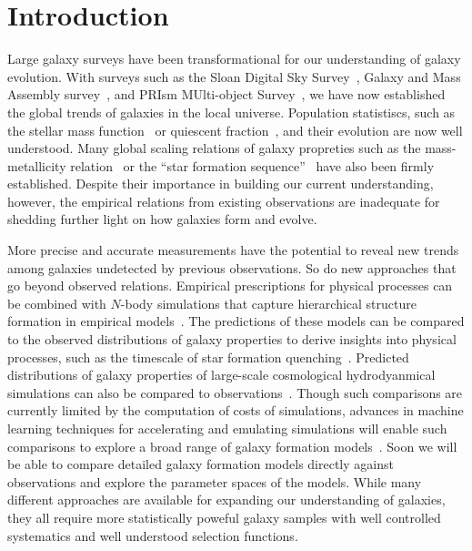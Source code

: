 \section{Introduction} \label{sec:intro} 
Large galaxy surveys have been transformational for our understanding of galaxy
evolution. 
With surveys such as the Sloan Digital Sky Survey~\citep[SDSS;][]{york2000},
Galaxy and Mass Assembly survey~\citep[GAMA;][]{driver2011}, and 
PRIsm MUlti-object Survey~\citep[PRIMUS;][]{coil2011}, 
we have now established the global trends of galaxies in the local universe. 
Population statistiscs, such as the stellar mass 
function~\citep{li2009, marchesini2009, moustakas2013} or quiescent
fraction~\citep{kauffmann2003a, blanton2003, baldry2006, taylor2009}, and their
evolution are now well understood. 
Many global scaling relations of galaxy propreties such as the mass-metallicity
relation~\citep{tremonti2004} or
the ``star formation sequence''~\citep{noeske2007, daddi2007, salim2007} have
also been firmly established. 
Despite their importance in building our current understanding, however,
the empirical relations from existing observations are inadequate for
shedding further light on how galaxies form and evolve.

More precise and accurate measurements have the potential to reveal new trends
among galaxies undetected by previous observations.
So do new approaches that go beyond observed relations.
Empirical prescriptions for physical processes can be combined with $N$-body
simulations that capture hierarchical structure formation in empirical 
models~\citep[\emph{e.g.} {\sc UniverseMachine}][]{behroozi2019}. 
The predictions of these models can be compared to the observed distributions
of galaxy properties to derive insights into physical processes, such as the
timescale of star formation quenching~\citep{wetzel2013, hahn2017, tinker2017}. 
Predicted distributions of galaxy properties of large-scale cosmological 
hydrodyanmical simulations can also be compared to 
observations~\citep[\emph{e.g.}][]{genel2014, somerville2015a, dave2017a,
trayford2017, dickey2021, donnari2021}.
Though such comparisons are currently limited by the computation of costs of
simulations, advances in machine learning techniques for accelerating and
emulating simulations will enable such comparisons to explore a broad range of
galaxy formation models~\citep[\emph{e.g.}][]{villaescusa-navarro2021}.
Soon we will be able to compare detailed galaxy formation models directly
against observations and explore the parameter spaces of the models. 
While many different approaches are available for expanding our understanding
of galaxies, they all require more statistically poweful galaxy samples with
well controlled systematics and well understood selection functions. 

